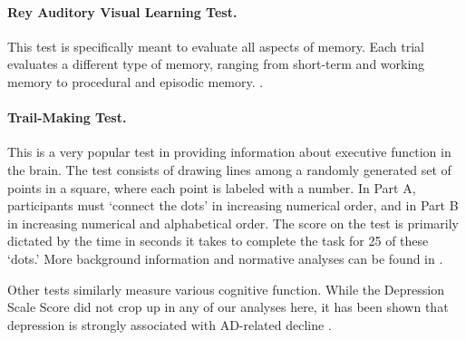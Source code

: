\paragraph{Rey Auditory Visual Learning Test.} This test is specifically meant to evaluate all aspects of memory. Each trial evaluates a different type of memory, ranging from short-term and working memory to procedural and episodic memory. \cite{schmidt1996rey}.

\paragraph{Trail-Making Test.} This is a very popular test in providing information about executive function in the brain. The test consists of drawing lines among a randomly generated set of points in a square, where each point is labeled with a number. In Part A, participants must `connect the dots' in increasing numerical order, and in Part B in increasing numerical and alphabetical order. The score on the test is primarily dictated by the time in seconds it takes to complete the task for 25 of these `dots.' More background information and normative analyses can be found in \cite{tombaugh2004trail}.

Other tests similarly measure various cognitive function. While the Depression Scale Score did not crop up in any of our analyses here, it has been shown that depression is strongly associated with AD-related decline \cite{wragg1989overview}.